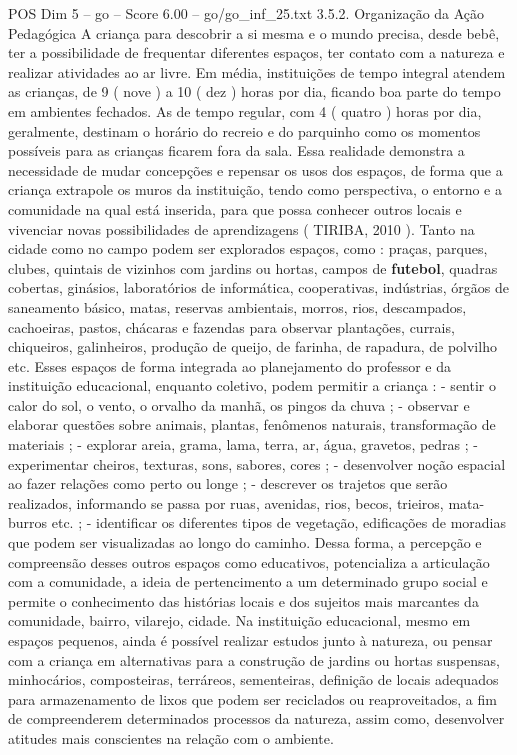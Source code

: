 \begin{textsample}{POS Dim 5 – go – Score 6.00 – go/go\_inf\_25.txt}  \label{ex:f5_pos_015}
3.5.2.
Organização da Ação Pedagógica A criança para descobrir a si mesma e o mundo precisa, desde bebê, ter a possibilidade de frequentar diferentes espaços, ter contato com a natureza e realizar atividades ao ar livre.
Em média, instituições de tempo integral atendem as crianças, de 9 ( nove ) a 10 ( dez ) horas por dia, ficando boa parte do tempo em ambientes fechados.
As de tempo regular, com 4 ( quatro ) horas por dia, geralmente, destinam o horário do recreio e do parquinho como os momentos possíveis para as crianças ficarem fora da sala.
Essa realidade demonstra a necessidade de mudar concepções e repensar os usos dos espaços, de forma que a criança extrapole os muros da instituição, tendo como perspectiva, o entorno e a comunidade na qual está inserida, para que possa conhecer outros locais e vivenciar novas possibilidades de aprendizagens ( TIRIBA, 2010 ).
Tanto na cidade como no campo podem ser explorados espaços, como : praças, parques, clubes, quintais de vizinhos com jardins ou hortas, campos de \textbf{futebol}, quadras cobertas, ginásios, laboratórios de informática, cooperativas, indústrias, órgãos de saneamento básico, matas, reservas ambientais, morros, rios, descampados, cachoeiras, pastos, chácaras e fazendas para observar plantações, currais, chiqueiros, galinheiros, produção de queijo, de farinha, de rapadura, de polvilho etc.
Esses espaços de forma integrada ao planejamento do professor e da instituição educacional, enquanto coletivo, podem permitir a criança : - sentir o calor do sol, o vento, o orvalho da manhã, os pingos da chuva ; - observar e elaborar questões sobre animais, plantas, fenômenos naturais, transformação de materiais ; - explorar areia, grama, lama, terra, ar, água, gravetos, pedras ; - experimentar cheiros, texturas, sons, sabores, cores ; - desenvolver noção espacial ao fazer relações como perto ou longe ; - descrever os trajetos que serão realizados, informando se passa por ruas, avenidas, rios, becos, trieiros, mata-burros etc. ; - identificar os diferentes tipos de vegetação, edificações de moradias que podem ser visualizadas ao longo do caminho.
Dessa forma, a percepção e compreensão desses outros espaços como educativos, potencializa a articulação com a comunidade, a ideia de pertencimento a um determinado grupo social e permite o conhecimento das histórias locais e dos sujeitos mais marcantes da comunidade, bairro, vilarejo, cidade.
Na instituição educacional, mesmo em espaços pequenos, ainda é possível realizar estudos junto à natureza, ou pensar com a criança em alternativas para a construção de jardins ou hortas suspensas, minhocários, composteiras, terráreos, sementeiras, definição de locais adequados para armazenamento de lixos que podem ser reciclados ou reaproveitados, a fim de compreenderem determinados processos da natureza, assim como, desenvolver atitudes mais conscientes na relação com o ambiente.

\end{textsample}
